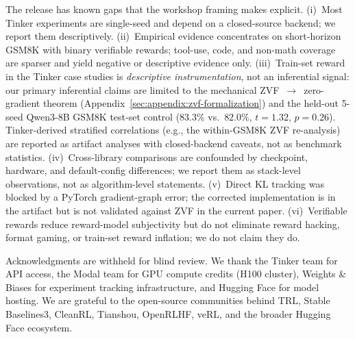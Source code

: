 \documentclass{article}
\begin{document}
The release has known gaps that the workshop framing makes explicit. (i)~Most
Tinker experiments are single-seed and depend on a closed-source backend; we
report them descriptively. (ii)~Empirical evidence concentrates on
short-horizon GSM8K with binary verifiable rewards; tool-use, code, and
non-math coverage are sparser and yield negative or descriptive evidence
only. (iii)~Train-set reward in the Tinker case studies is \emph{descriptive
instrumentation}, not an inferential signal: our primary inferential claims
are limited to the mechanical ZVF~$\to$~zero-gradient theorem
(Appendix~\ref{sec:appendix:zvf-formalization}) and the held-out 5-seed Qwen3-8B
GSM8K test-set control ($83.3\%$ vs.\ $82.0\%$, $t{=}1.32$, $p{=}0.26$).
Tinker-derived stratified correlations (e.g., the within-GSM8K ZVF
re-analysis) are reported as artifact analyses with closed-backend caveats,
not as benchmark statistics. (iv)~Cross-library comparisons are confounded by
checkpoint, hardware, and default-config differences; we report them as
stack-level observations, not as algorithm-level statements. (v)~Direct KL
tracking was blocked by a PyTorch gradient-graph error; the corrected
implementation is in the artifact but is not validated against ZVF in the
current paper. (vi)~Verifiable rewards reduce reward-model subjectivity but
do not eliminate reward hacking, format gaming, or train-set reward
inflation; we do not claim they do.





\label{sec:acknowledgments}
\begin{ack}
Acknowledgments are withheld for blind review. We thank the Tinker team for
API access, the Modal team for GPU compute credits (H100 cluster), Weights
\& Biases for experiment tracking infrastructure, and Hugging Face for model
hosting. We are grateful to the open-source communities behind TRL, Stable
Baselines3, CleanRL, Tianshou, OpenRLHF, veRL, and the broader Hugging Face
ecosystem.
\end{ack}




\appendix






\end{document}
